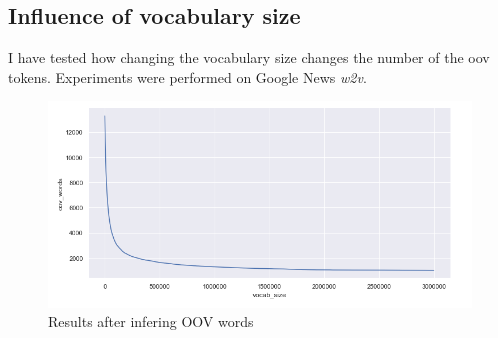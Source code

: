 \documentclass{article}
\begin{document}
\subsection{Influence of vocabulary size}
I have tested how changing the vocabulary size changes the number of the oov tokens.
Experiments were performed on Google News \textit{w2v}.
\begin{figure}[h]
    \centering
    \includegraphics[scale=0.5]{../figures/vocab_size.png}
    \caption{Results after infering OOV words}
\end{figure}
\end{document}
